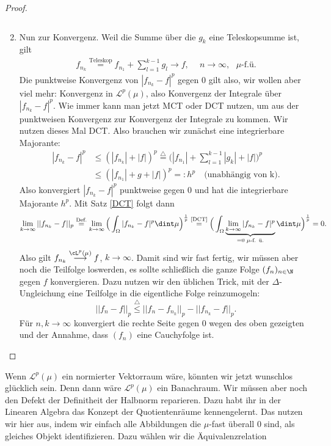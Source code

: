\begin{proof}
\begin{enumerate}[label=(\roman*)]
\[		\]
		\item Nun zur Konvergenz. Weil die Summe \"uber die $g_k$ eine Teleskopsumme ist, gilt  
		\begin{align*}
			f_{n_k} \overset{\text{Teleskop}}{=} f_{n_1} + \sum\limits_{l=1}^{k-1} g_l \to f,\quad \: n \to \infty, \text{ $\mu$-f.ü.}
		\end{align*}
		Die punktweise Konvergenz von $|f_{n_k}-f|^p$ gegen $0$ gilt also, wir wollen aber viel mehr: Konvergenz in $\mathcal L^p(\mu)$, also Konvergenz der Integrale \"uber $|f_{n_k}-f|^p$. Wie immer kann man jetzt MCT oder DCT nutzen, um aus der punktweisen Konvergenz zur Konvergenz der Integrale zu kommen. Wir nutzen dieses Mal DCT. Also brauchen wir zun\"achst eine integrierbare Majorante:
		\begin{align*}
			|f_{n_k} - f |^p &\leq (| f_{n_k}| + |f|)^p \overset{\triangle}{=}\Big( |f_{n_1}| + \sum\limits_{l=1}^{k-1} |g_k| + |f| \Big)^p\\
			&\leq (|f_{n_1}| + g + |f|)^p =: h^p \quad \text{(unabhängig von k)}.		
		\end{align*}
		Also konvergiert $|f_{n_k}-f|^p$ punktweise gegen $0$ und hat die integrierbare Majorante $h^p$. Mit Satz \ref{DCT} folgt dann
		\begin{align*}
		\lim\limits_{k \to \infty} || f_{n_k} - f ||_p \overset{\text{Def.}}{=} \lim\limits_{k \to \infty} \Big(\int_{\Omega} | f_{n_k} - f |^p\dint \mu\Big)^\frac{1}{p} \overset{\text{\ref{DCT}}}{=}
		\Big(\int_{\Omega} \underbrace{\lim\limits_{k \to \infty} | f_{n_k} - f |^p}_{=0 \text{ $\mu$-f. ü.}} \dint \mu\Big)^\frac{1}{p} = 0.
		\end{align*}
		Also gilt $f_{n_k} \overset{\cL^p(\mu)}{\longrightarrow} f$, $k \to \infty$. Damit sind wir fast fertig, wir m\"ussen aber noch die Teilfolge loswerden, es sollte schlie\ss lich die ganze Folge $(f_n)_{n\in\N}$ gegen $f$ konvergieren. Dazu nutzen wir den \"ublichen Trick, mit der $\Delta$-Ungleichung eine Teilfolge in die eigentliche Folge reinzumogeln:
		\[ ||f_n - f ||_p \overset{\triangle}{\leq} ||f_n - f_{n_k} ||_p - ||f_{n_k} - f ||_p.
		\]
		F\"ur $n,k\to\infty$ konvergiert die rechte Seite gegen $0$ wegen des oben gezeigten und der Annahme, dass $(f_n)$ eine Cauchyfolge ist.
	\end{enumerate}
\end{proof}
Wenn $\mathcal L^p(\mu)$ ein normierter Vektorraum w\"are, k\"onnten wir jetzt wunschlos gl\"ucklich sein. Denn dann w\"are $\mathcal L^p(\mu)$ ein Banachraum. Wir m\"ussen aber noch den Defekt der Definitheit der Halbnorm reparieren. Dazu habt ihr in der Linearen Algebra das Konzept der Quotientenr\"aume kennengelernt. Das nutzen wir hier aus, indem wir einfach alle Abbildungen die $\mu$-fast \"uberall $0$ sind, als gleiches Objekt identifizieren. Dazu w\"ahlen wir die \"Aquivalenzrelation

